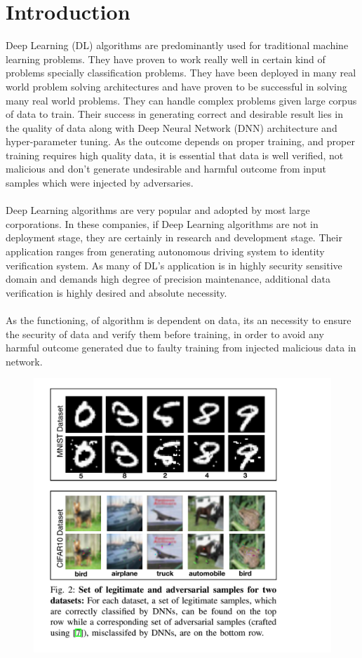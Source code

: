 \documentclass[12pt]{article}
\begin{document}
\section*{Introduction}
Deep Learning (DL) algorithms are predominantly used for traditional machine learning problems. They have proven to work really well in certain kind of problems  specially classification problems. They have been deployed in many real world problem solving architectures and have proven to be successful in solving many real world problems. They can handle complex problems given large corpus of data to train. Their success in generating correct and desirable result lies in the quality of data along with Deep Neural Network (DNN) architecture and hyper-parameter tuning. As the outcome depends on proper training, and proper training requires high quality data, it is essential that data is well verified, not malicious and don't generate undesirable and harmful outcome from input samples which were injected by adversaries.\\\\
Deep Learning algorithms are very popular and adopted by most large corporations. In these companies, if Deep Learning algorithms are not in deployment stage, they are certainly in research and development stage. Their application ranges from generating autonomous driving system to identity verification system. As many of DL's application is in highly security sensitive domain and demands high degree of precision maintenance, additional data verification is highly desired and absolute necessity.\\\\
As the functioning, of algorithm is dependent on data, its an necessity to ensure the security of data and verify them before training, in order to avoid any harmful outcome generated due to faulty training from injected malicious data in network.
\begin{figure}[H]
\begin{center}
\includegraphics[scale=.42]{error}
\end{center}
\end{figure}
\end{document}
